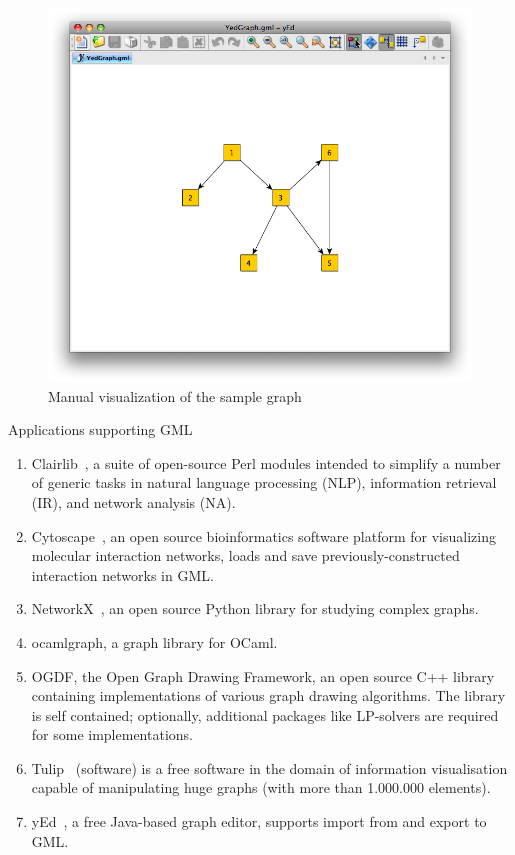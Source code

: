 \documentclass[a4paper,oneside]{article}
\begin{document}
\begin{center}
\begin{figure}
	\includegraphics[scale=0.5]{YedGraph.png}
	\caption{Manual visualization of the sample graph}
	\label{yed_graph_vis}
\end{figure}
\end{center}


Applications supporting GML~\cite{GML_wiki}

\begin{enumerate}
\item Clairlib~\cite{clairlib}, a suite of open-source Perl modules intended to simplify a number of generic tasks in natural language processing (NLP), information retrieval (IR), and network analysis (NA).
\item Cytoscape~\cite{Cytoscape}, an open source bioinformatics software platform for visualizing molecular interaction networks, loads and save previously-constructed interaction networks in GML.
\item NetworkX~\cite{NetworkX}, an open source Python library for studying complex graphs.
\item ocamlgraph\cite{ocamlgraph}, a graph library for OCaml.
\item OGDF\cite{OGDF}, the Open Graph Drawing Framework, an open source C++ library containing implementations of various graph drawing algorithms. The library is self contained; optionally, additional packages like LP-solvers are required for some implementations.
\item Tulip~\cite{Tulip} (software) is a free software in the domain of information visualisation capable of manipulating huge graphs (with more than 1.000.000 elements).
\item yEd~\cite{yEd}, a free Java-based graph editor, supports import from and export to GML.
\end{enumerate}
\end{document}

